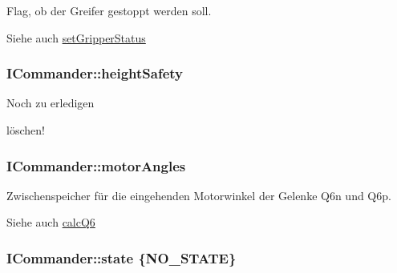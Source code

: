 Flag, ob der Greifer gestoppt werden soll. 

\begin{DoxySeeAlso}{Siehe auch}
\hyperlink{classICommander_a8a9f1636cbe5526d490266be84e6a57f}{set\-Gripper\-Status} 
\end{DoxySeeAlso}
\hypertarget{classICommander_a166295c90210dae6c74e96d749c8ea1a}{
\subsubsection[{height\-Safety}]{\setlength{\rightskip}{0pt plus 5cm}I\-Commander\-::height\-Safety\hspace{0.3cm}{\ttfamily [protected]}}}\label{classICommander_a166295c90210dae6c74e96d749c8ea1a}
\begin{DoxyRefDesc}{Noch zu erledigen}
\item[\hyperlink{todo__todo000003}{Noch zu erledigen}]löschen! \end{DoxyRefDesc}
\hypertarget{classICommander_ab1ed71f514ce422461e6cae7fb6e3c04}{
\subsubsection[{motor\-Angles}]{\setlength{\rightskip}{0pt plus 5cm}I\-Commander\-::motor\-Angles\hspace{0.3cm}{\ttfamily [protected]}}}\label{classICommander_ab1ed71f514ce422461e6cae7fb6e3c04}


Zwischenspeicher für die eingehenden Motorwinkel der Gelenke Q6n und Q6p. 

\begin{DoxySeeAlso}{Siehe auch}
\hyperlink{classICommander_a1967688a309974862c4a81b5fe04c3eb}{calc\-Q6} 
\end{DoxySeeAlso}
\hypertarget{classICommander_a72cb524deeb95b224db0242efc4728d4}{
\subsubsection[{state}]{\setlength{\rightskip}{0pt plus 5cm}I\-Commander\-::state \{N\-O\-\_\-\-S\-T\-A\-T\-E\}\hspace{0.3cm}{\ttfamily [protected]}}}\label{classICommander_a72cb524deeb95b224db0242efc4728d4}


